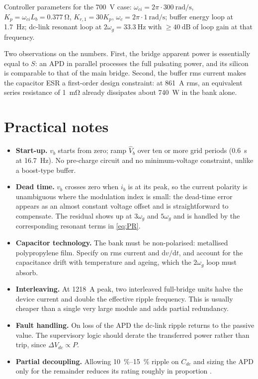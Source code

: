 \documentclass[11pt,a4paper]{article}
\newcommand{\dif}{\mathrm{d}}
\begin{document}
Controller parameters for the \SI{700}{\volt} case:
$\omega_{ci}=2\pi\cdot\SI{300}{\radian\per\second}$,
$K_p=\omega_{ci}L_b=\SI{0.377}{\ohm}$, $K_{r,1}=30K_p$,
$\omega_c=2\pi\cdot\SI{1}{\radian\per\second}$; buffer energy loop at
\SI{1.7}{\hertz}; dc-link resonant loop at $2\omega_g=\SI{33.3}{\hertz}$ with
$\ge\SI{40}{\deci\bel}$ of loop gain at that frequency.

Two observations on the numbers. First, the bridge apparent power is essentially
equal to $S$: an APD in parallel processes the full pulsating power, and its
silicon is comparable to that of the main bridge. Second, the buffer rms current
makes the capacitor ESR a first-order design constraint: at
\SI{861}{\ampere} rms, an equivalent series resistance of \SI{1}{\milli\ohm}
already dissipates about \SI{740}{\watt} in the bank alone.

\section{Practical notes}

\begin{itemize}
\item \textbf{Start-up.} $v_b$ starts from zero; ramp $\hat V_b$ over ten or
more grid periods (\SI{0.6}{\second} at \SI{16.7}{\hertz}). No pre-charge
circuit and no minimum-voltage constraint, unlike a boost-type buffer.

\item \textbf{Dead time.} $v_b$ crosses zero when $i_b$ is at its peak, so the
current polarity is unambiguous where the modulation index is small: the
dead-time error appears as an almost constant voltage offset and is
straightforward to compensate. The residual shows up at $3\omega_g$ and
$5\omega_g$ and is handled by the corresponding resonant terms in
\eqref{eq:PR}.

\item \textbf{Capacitor technology.} The bank must be non-polarised: metallised
polypropylene film. Specify on rms current and $\dif v/\dif t$, and account for
the capacitance drift with temperature and ageing, which the $2\omega_g$ loop
must absorb.

\item \textbf{Interleaving.} At \SI{1218}{\ampere} peak, two interleaved
full-bridge units halve the device current and double the effective ripple
frequency. This is usually cheaper than a single very large module and adds
partial redundancy.

\item \textbf{Fault handling.} On loss of the APD the dc-link ripple returns to
the passive value. The supervisory logic should derate the transferred power
rather than trip, since $\Delta V_{dc}\propto P$.

\item \textbf{Partial decoupling.} Allowing \SIrange{10}{15}{\percent} ripple on
$C_{dc}$ and sizing the APD only for the remainder reduces its rating roughly in
proportion \cite{neumayr2021partial}.
\end{itemize}
\end{document}
